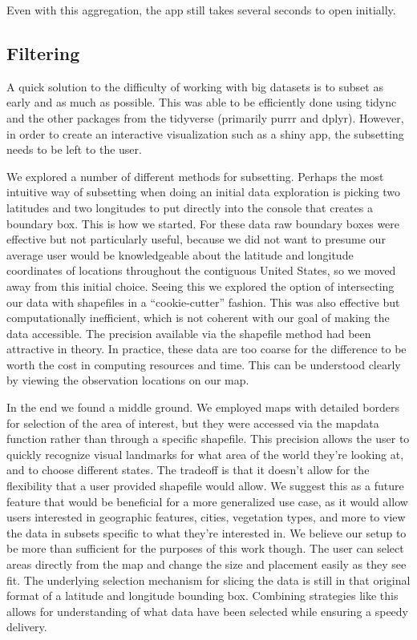 \documentclass[10pt,letterpaper]{article}
\begin{document}
Even with this aggregation, the app still takes several seconds to open initially.


\subsection*{Filtering}

A quick solution to the difficulty of working with big datasets is to subset as early and as much as possible. This was able to be efficiently done using tidync \cite{tidync} and the other packages from the tidyverse\cite{tidyverse} (primarily purrr and dplyr). However, in order to create an interactive visualization such as a shiny app, the subsetting needs to be left to the user.

We explored a number of different methods for subsetting. Perhaps the most intuitive way of subsetting when doing an initial data exploration is picking two latitudes and two longitudes to put directly into the console that creates a boundary box. This is how we started. For these data raw boundary boxes were effective but not particularly useful, because we did not want to presume our average user would be knowledgeable about the latitude and longitude coordinates of locations throughout the contiguous United States, so we moved away from this initial choice. Seeing this we explored the option of intersecting our data with shapefiles in a “cookie-cutter” fashion. This was also effective but computationally inefficient, which is not coherent with our goal of making the data accessible. The precision available via the shapefile method had been attractive in theory. In practice, these data are too coarse for the difference to be worth the cost in computing resources and time. This can be understood clearly by viewing the observation locations on our map.

In the end we found a middle ground. We employed maps with detailed borders for selection of the area of interest, but they were accessed via the mapdata function rather than through a specific shapefile. This precision allows the user to quickly recognize visual landmarks for what area of the world they’re looking at, and to choose different states. The tradeoff is that it doesn’t allow for the flexibility that a user provided shapefile would allow. We suggest this as a future feature that would be beneficial for a more generalized use case, as it would allow users interested in geographic features, cities, vegetation types, and more to view the data in subsets specific to what they’re interested in. We believe our setup to be more than sufficient for the purposes of this work though. The user can select areas directly from the map and change the size and placement easily as they see fit. The underlying selection mechanism for slicing the data is still in that original format of a latitude and longitude bounding box. Combining strategies like this allows for understanding of what data have been selected while ensuring a speedy delivery.
\end{document}
